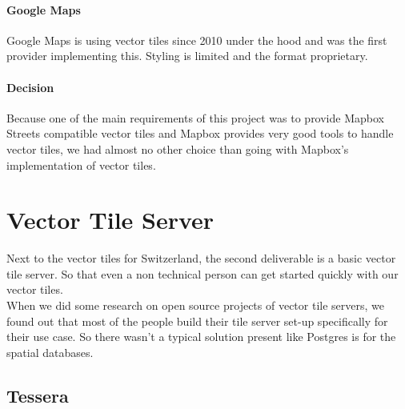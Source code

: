 \paragraph{Google Maps}

Google Maps is using vector tiles since 2010 under the hood and was the
first provider implementing this. Styling is limited and the format
proprietary.

\paragraph{Decision} Because one of the main requirements of this project was to provide Mapbox Streets compatible vector tiles and Mapbox provides very good tools to handle vector tiles, we had almost no other choice than going with Mapbox's implementation of vector tiles.

\section{Vector Tile Server}\label{vector_tile_server}

Next to the vector tiles for Switzerland, the second deliverable is a basic vector tile server. So that even a non technical person can get started quickly with our vector tiles.\\
When we did some research on open source projects of vector tile servers, we found out that most of the people build their tile server set-up specifically for their use case. So there wasn't a typical solution present like Postgres is for the spatial databases.

\subsection{Tessera}\label{tessera}

